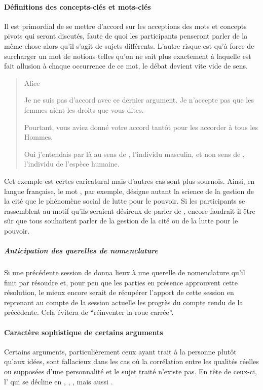 \paragraph{Définitions des concepts-clés et mots-clés}
Il est primordial de se mettre d’accord sur les acceptions des mots et concepts pivots qui seront discutés, faute de quoi les participants penseront parler de la même chose alors qu’il s’agit de sujets différents. L’autre risque est qu’à force de surcharger un mot de notions telles qu’on ne sait plus exactement à laquelle est fait allusion à chaque occurrence de ce mot, le débat devient vite vide de sens.

\begin{quote}
  \begin{drama}{0cm}{0cm}{Alice}

    \Aspeaks Je ne suis pas d’accord avec ce dernier argument. Je n’accepte pas que les femmes aient les droits que vous dites.

    \Bspeaks Pourtant, vous aviez donné votre accord tantôt pour les accorder à tous les Hommes.

    \Aspeaks Oui j’entendais par là  au sens de , l’individu masculin, et non  sens de , l’individu de l’espèce humaine.

  \end{drama}
\end{quote}

Cet exemple est certes caricatural mais d’autres cas sont plus sournois. Ainsi, en langue française, le mot , par exemple, désigne autant la science de la gestion de la cité que le phénomène social de lutte pour le pouvoir. Si les participants se rassemblent au motif qu’ils seraient désireux de parler de , encore faudrait-il être sûr que tous souhaitent parler de la gestion de la cité ou de la lutte pour le pouvoir.

\subparagraph{Anticipation des querelles de nomenclature}
Si une précédente session de \mainabbr{} donna lieux à une querelle de nomenclature qu’il finit par résoudre et, pour peu que les parties en présence approuvent cette résolution, le mieux encore serait de récupérer l’apport de cette session en reprenant au compte de la session actuelle les progrès du compte rendu de la précédente. Cela évitera de \enquote{réinventer la roue carrée}.

\paragraph{Caractère sophistique de certains arguments}
Certains arguments, particulièrement ceux ayant trait à la personne plutôt qu’aux idées, sont fallacieux dans les cas où la corrélation entre les qualités réelles ou supposées d’une personnalité et le sujet traité n’existe pas. En tête de ceux-ci, l’ qui se décline en , , , mais aussi .

